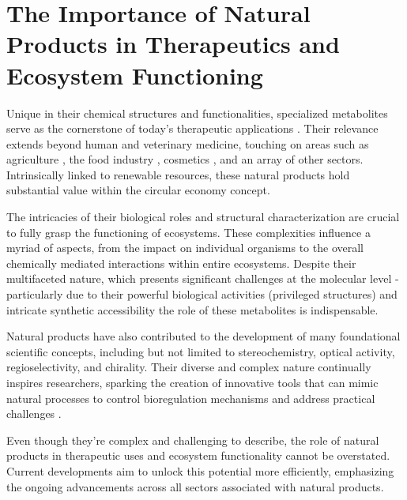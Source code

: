 \documentclass[
11pt, %
oneside, %
english, %
singlespacing, %
headsepline, %
chapterinoneline, %
]{MastersDoctoralThesis} %
\begin{document}
\section{The Importance of Natural Products in Therapeutics and Ecosystem Functioning}
Unique in their chemical structures and functionalities, specialized metabolites serve as the cornerstone of today's therapeutic applications \cite{harveyReemergenceNaturalProducts2015}. Their relevance extends beyond human and veterinary medicine, touching on areas such as agriculture \cite{yanImpactProspectNatural2018}, the food industry \cite{gonzalez-manzanoApplicationsNaturalProducts2021}, cosmetics \cite{liuNaturalProductsCosmetics2022}, and an array of other sectors. Intrinsically linked to renewable resources, these natural products hold substantial value within the circular economy concept.

The intricacies of their biological roles and structural characterization are crucial to fully grasp the functioning of ecosystems. These complexities influence a myriad of aspects, from the impact on individual organisms to the overall chemically mediated interactions within entire ecosystems. Despite their multifaceted nature, which presents significant challenges at the molecular level - particularly due to their powerful biological activities (privileged structures) and intricate synthetic accessibility the role of these metabolites is indispensable.

Natural products have also contributed to the development of many foundational scientific concepts, including but not limited to stereochemistry, optical activity, regioselectivity, and chirality. Their diverse and complex nature continually inspires researchers, sparking the creation of innovative tools that can mimic natural processes to control bioregulation mechanisms and address practical challenges \cite{drasarGrowingImportanceNatural2019}.

Even though they're complex and challenging to describe, the role of natural products in therapeutic uses and ecosystem functionality cannot be overstated. Current developments aim to unlock this potential more efficiently, emphasizing the ongoing advancements across all sectors associated with natural products.
\end{document}
